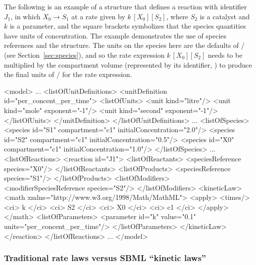 The following is an example of a \Reaction structure that defines
a reaction with identifier $J_1$, in which $X_0 \rightarrow S_1$
at a rate given by $k\, [X_0] [S_2]$, where $S_2$ is a catalyst
and $k$ is a parameter, and the square brackets symbolizes that
the species quantities have units of concentration.  The example
demonstrates the use of species references and the \KineticLaw
structure.  The units on the species here are the defaults of
/ (see
Section~\ref{sec:species}), and so the rate expression $k\, [X_0]
[S_2]$ needs to be multiplied by the compartment volume
(represented by its identifier, ) to produce the final
units of / for the rate
expression.

\begin{example}
<model>
    ...
    <listOfUnitDefinitions>
        <unitDefinition id="per_concent_per_time">
            <listOfUnits>
                <unit kind="litre"/>
                <unit kind="mole"   exponent="-1"/>
                <unit kind="second" exponent="-1"/>
            </listOfUnits>
        </unitDefinition>
    </listOfUnitDefinitions>
    ...
    <listOfSpecies>
        <species id="S1" compartment="c1" initialConcentration="2.0"/>
        <species id="S2" compartment="c1" initialConcentration="0.5"/>
        <species id="X0" compartment="c1" initialConcentration="1.0"/>
    </listOfSpecies>
    ...
    <listOfReactions>
        <reaction id="J1">
            <listOfReactants>
                <speciesReference species="X0"/>
            </listOfReactants>
            <listOfProducts>
                <speciesReference species="S1"/>
            </listOfProducts>
            <listOfModifiers>
                <modifierSpeciesReference species="S2"/>
            </listOfModifiers>
            <kineticLaw>
                <math xmlns="http://www.w3.org/1998/Math/MathML">
                    <apply>
                        <times/>
                        <ci> k </ci>
                        <ci> S2 </ci>
                        <ci> X0 </ci>
                        <ci> c1 </ci>
                    </apply>
                </math>
                <listOfParameters>
                    <parameter id="k" value="0.1" units="per_concent_per_time"/>
                </listOfParameters>
            </kineticLaw>
        </reaction>
    </listOfReactions>
    ...
</model>
\end{example}



\subsubsection{Traditional rate laws versus SBML ``kinetic laws''}
\label{sec:about-kinetic-laws}

